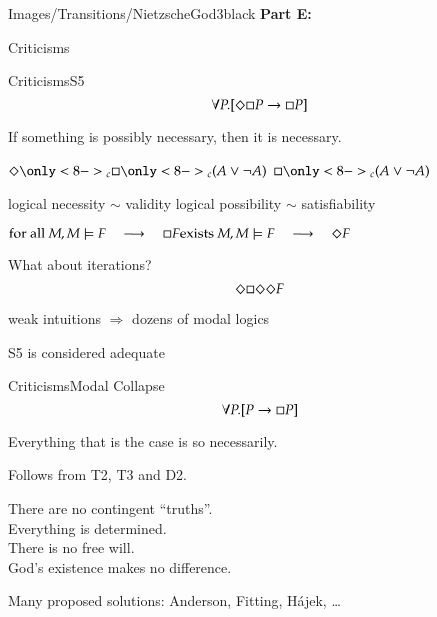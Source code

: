 \begin{transitionframe}{Images/Transitions/NietzscheGod3}{black}
\textbf{Part E:}

Criticisms
\end{transitionframe}

\begin{frame}{Criticisms}{S5} \centering
$$
\forall P.[ \Diamond \Box P \rightarrow \Box P ] 
$$

\medskip

If something is possibly necessary, then it is necessary.

\pause

\bigskip


$
\pos\only<8->{_c} \nec\only<8->{_c} (A \vee \neg A)
$
\pause
\qquad 
$
\nec\only<8->{_c} (A \vee \neg A)
$

\pause

\bigskip

logical necessity $\sim$ validity
\hfill
logical possibility $\sim$ satisfiability

\pause 

\medskip

$ 
\textrm{for all } M, M \models F 
\quad \longrightarrow \quad
\nec F
\hfill
\textrm{exists } M, M \models F 
\quad \longrightarrow \quad
\pos F
$

\pause

\bigskip

What about iterations?
$$
\Diamond \Box \Diamond \Diamond F
$$

\medskip

\pause

weak intuitions $\Rightarrow$ dozens of modal logics

\medskip

\pause

\alert{S5 is considered adequate}


\end{frame}


\begin{frame}{Criticisms}{Modal Collapse} \centering
$$
\forall P.[ P \rightarrow \Box P ] 
$$

\medskip

Everything that is the case is so necessarily.

\pause

\medskip

Follows from T2, T3 and D2.

\pause

\medskip

There are no contingent ``truths''. \\ \pause
Everything is determined. \\ \pause
There is no free will. \\ \pause
God's existence makes no difference.

\pause
\bigskip

Many proposed solutions: Anderson, Fitting, H\'ajek, \ldots
 
\end{frame}



